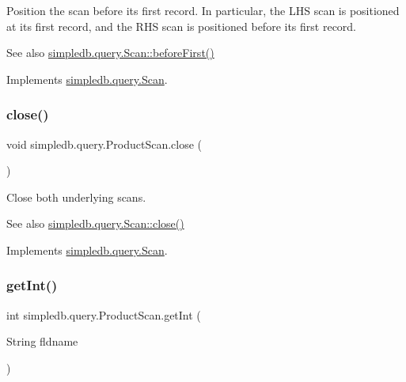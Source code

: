 Position the scan before its first record. In particular, the L\+HS scan is positioned at its first record, and the R\+HS scan is positioned before its first record. \begin{DoxySeeAlso}{See also}
\hyperlink{interfacesimpledb_1_1query_1_1Scan_a2eceb634b69da9bf1269a4355808cc6b}{simpledb.\+query.\+Scan\+::before\+First()} 
\end{DoxySeeAlso}


Implements \hyperlink{interfacesimpledb_1_1query_1_1Scan_a2eceb634b69da9bf1269a4355808cc6b}{simpledb.\+query.\+Scan}.

\mbox{\label{classsimpledb_1_1query_1_1ProductScan_a58ee47fd6a8b397c3ad386fd7f3d257e}} 
\subsubsection{\texorpdfstring{close()}{close()}}
{\footnotesize\ttfamily void simpledb.\+query.\+Product\+Scan.\+close (\begin{DoxyParamCaption}{ }\end{DoxyParamCaption})\hspace{0.3cm}{\ttfamily [inline]}}

Close both underlying scans. \begin{DoxySeeAlso}{See also}
\hyperlink{interfacesimpledb_1_1query_1_1Scan_a260f40a8c82edaa00398bea9d698933c}{simpledb.\+query.\+Scan\+::close()} 
\end{DoxySeeAlso}


Implements \hyperlink{interfacesimpledb_1_1query_1_1Scan_a260f40a8c82edaa00398bea9d698933c}{simpledb.\+query.\+Scan}.

\mbox{\label{classsimpledb_1_1query_1_1ProductScan_a7b94328d04d2d0bf10f460d6abfc9299}} 
\subsubsection{\texorpdfstring{get\+Int()}{getInt()}}
{\footnotesize\ttfamily int simpledb.\+query.\+Product\+Scan.\+get\+Int (\begin{DoxyParamCaption}\item[{String}]{fldname }\end{DoxyParamCaption})\hspace{0.3cm}{\ttfamily [inline]}}


